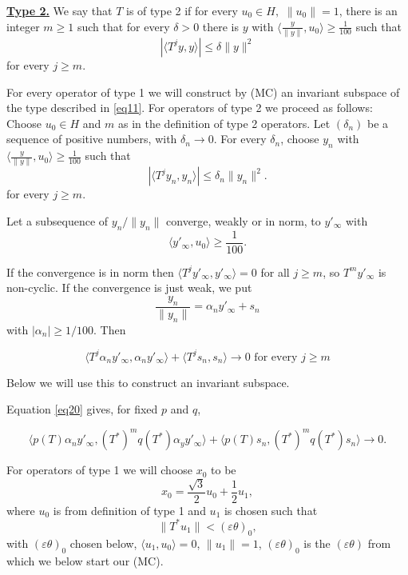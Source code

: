 \documentclass[12pt,oneside,reqno]{amsart}
\theoremstyle{definition}
\begin{document}
\bigskip 

\noindent \textbf{\underline{Type 2.}}  We say that $T$ is of type 2 if  for every  $u_0 \in H, $ $\|u_0\| = 1$, there is an integer $m \ge 1$ such that for every $\delta > 0$ there is $y$ with 
$\displaystyle \langle \frac{y}{\|y\|}, u_0 \rangle \ge \frac{1}{100}$ such that
$$	\left| \langle T^j y, y\rangle\right| \le \delta \|y\|^2$$
for every $j \ge m$.

For every operator of type 1 we will construct by (MC) an invariant subspace of the type described in \eqref{eq11}. For operators of type 2 we proceed as follows:  Choose $u_0 \in H$ and $m$ as in the definition of type 2 operators. Let $(\delta_n)$ be a sequence of positive numbers, with $\delta_n \rightarrow 0$. For every $\delta_n$, choose $y_n$ with $\displaystyle \langle \frac{y}{\|y\|}, u_0 \rangle \ge \frac{1}{100}$ such that 
$$	\left| \langle T^j y_n, y_n \rangle\right| \le \delta_n \|y_n\|^2.$$
for every $j \ge m$.

Let a subsequence of $y_n / \|y_n\|$ converge, weakly or in norm, to $y'_{\infty}$ with 
$$\displaystyle \langle y'_{\infty},u_0\rangle \ge \frac{1}{100}.$$ 

If the convergence is in norm then $\displaystyle \langle T^j y'_{\infty}, y'_{\infty} \rangle = 0$ for all $j \ge m$, so $T^m y'_{\infty}$ is non-cyclic. If the convergence is just weak, we put 
$$\frac{y_n}{\|y_n\|} = \alpha_n y'_{\infty} + s_n$$
with $|\alpha_n| \ge 1/100$. Then

\begin{equation}\label{eq20}
\langle T^j \alpha_n y'_{\infty},\alpha_n y'_{\infty} \rangle + \langle T^j s_n, s_n\rangle \longrightarrow 0 \text{ for every } j \ge m
\end{equation}

Below we will use this to construct an invariant subspace.

Equation \eqref{eq20} gives, for fixed $p$ and $q$, 

\begin{equation}\label{eq21}
\langle p(T) \alpha_n y'_{\infty}, (T^*)^m q(T^*) \alpha_y y'_{\infty} \rangle + \langle p(T)s_n, (T^*)^m q(T^*) s_n \rangle \longrightarrow 0.
\end{equation}

For operators of type 1 we will choose $x_0$ to be 
$$x_0 = \frac{\sqrt{3}}{2} u_0 + \frac{1}{2} u_1,$$
where $u_0$ is from definition of type 1 and $u_1$ is chosen such that 
$$\| T^* u_1\| < (\varepsilon \theta)_0,$$
with $(\varepsilon \theta)_0$ chosen below, $\langle u_1, u_0 \rangle = 0$, $\|u_1\| = 1$, $(\varepsilon \theta)_0$ is the $(\varepsilon \theta)$ from which we below start our (MC).
\end{document}
